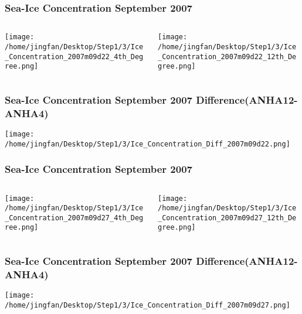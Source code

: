 \documentclass{beamer}
\begin{document}
\begin{frame}
\frametitle{Sea-Ice Concentration September 2007}

\begin{columns}
\begin{column}[t]{0.5\linewidth}
\centering
\texttt{[image: /home/jingfan/Desktop/Step1/3/Ice\_Concentration\_2007m09d22\_4th\_Degree.png]}
\end{column}
\begin{column}[t]{0.5\linewidth}
\centering
\texttt{[image: /home/jingfan/Desktop/Step1/3/Ice\_Concentration\_2007m09d22\_12th\_Degree.png]}
\end{column}
\end{columns}

\end{frame}

\begin{frame}
\frametitle{Sea-Ice Concentration September 2007 Difference(ANHA12-ANHA4)}

\texttt{[image: /home/jingfan/Desktop/Step1/3/Ice\_Concentration\_Diff\_2007m09d22.png]}

\end{frame}

\begin{frame}
\frametitle{Sea-Ice Concentration September 2007}

\begin{columns}
\begin{column}[t]{0.5\linewidth}
\centering
\texttt{[image: /home/jingfan/Desktop/Step1/3/Ice\_Concentration\_2007m09d27\_4th\_Degree.png]}
\end{column}
\begin{column}[t]{0.5\linewidth}
\centering
\texttt{[image: /home/jingfan/Desktop/Step1/3/Ice\_Concentration\_2007m09d27\_12th\_Degree.png]}
\end{column}
\end{columns}

\end{frame}

\begin{frame}
\frametitle{Sea-Ice Concentration September 2007 Difference(ANHA12-ANHA4)}

\texttt{[image: /home/jingfan/Desktop/Step1/3/Ice\_Concentration\_Diff\_2007m09d27.png]}

\end{frame}

\end{document}
